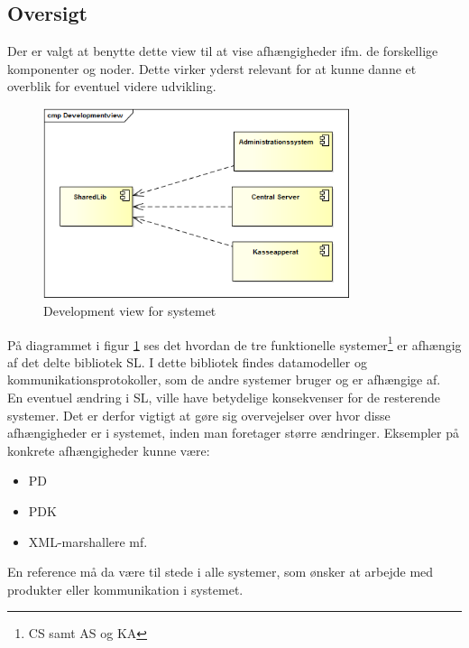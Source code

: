 \subsection{Oversigt}

Der er valgt at benytte dette view til at vise afhængigheder ifm. de forskellige komponenter og noder. 
Dette virker yderst relevant for at kunne danne et overblik for eventuel videre udvikling.


\begin{figure}[htb]
    \centering
    \includegraphics[width=0.8\textwidth]{Systemarkitektur/ImplementeringsView/Billeder/Development.png}
    \caption{Development view for systemet}
    \label{fig:devview}
\end{figure}


På diagrammet i figur \ref{fig:devview} ses det hvordan de tre funktionelle systemer\footnote{\gls{CS} samt \gls{AS} og \gls{KA}} er afhængig af det delte bibliotek \gls{SL}. I dette bibliotek findes datamodeller og kommunikationsprotokoller, som de andre systemer bruger og er afhængige af.\\
En eventuel ændring i \gls{SL}, ville have betydelige konsekvenser for de resterende systemer. Det er derfor vigtigt at gøre sig overvejelser over hvor disse afhængigheder er i systemet, inden man foretager større ændringer. Eksempler på konkrete afhængigheder kunne være:

\begin{itemize}
  \item \gls{PD}
  \item \gls{PDK}
  \item XML-marshallere mf.
\end{itemize}

En reference må da være til stede i alle systemer, som ønsker at arbejde med produkter eller kommunikation i systemet.
